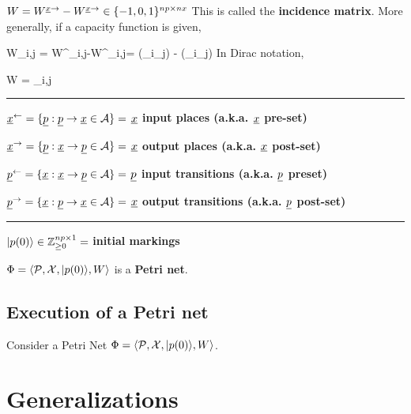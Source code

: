 $W =W^{{\underline{x}} \rightarrow}-W^{{\underline{x}} \rightarrow}\in \{-1, 0, 1\}^{np\times nx}$ This is called the {\bf incidence matrix}.
More generally, if a capacity function is given, 

\beq
W_{i,j} =
 W^{\rvx \rarrow}_{i,j}-W^{\rvx \larrow}_{i,j}=
\kappa(\rvp_i\rarrow \rvx_j)
-
\kappa(\rvp_i\larrow \rvx_j)
\eeq
In Dirac notation, 

\beq
W =  \sum_{i,j}
\eeq

\hrule
${\underline{x}}^\leftarrow = \{{\underline{p}} : {\underline{p}} \rightarrow {\underline{x}}\in{\cal A}\}=$ {\bf ${\underline{x}}$ input places (a.k.a. ${\underline{x}}$ pre-set)}

${\underline{x}}^\rightarrow = \{{\underline{p}} : {\underline{x}} \rightarrow {\underline{p}} \in {\cal A}\}=$ {\bf ${\underline{x}}$ output places (a.k.a. ${\underline{x}}$ post-set)}

${\underline{p}}^\leftarrow = \{{\underline{x}} : {\underline{x}} \rightarrow {\underline{p}} \in {\cal A} \}=$ {\bf${\underline{p}}$ input transitions (a.k.a. ${\underline{p}}$ preset)}

${\underline{p}}^\rightarrow = \{{\underline{x}} : {\underline{p}} \rightarrow{\underline{x}} \in{\cal A}\}=$ {\bf ${\underline{x}}$ output transitions (a.k.a. ${\underline{p}}$ post-set)}

\hrule
$|p(0)\rangle\in {\mathbb{Z}}_{\geq 0}^{np\times 1} =$ {\bf initial markings}

$\Phi = \left\langle{\cal P}, {\cal X},|p(0)\rangle, W\right\rangle$ is a {\bf Petri net}.
\subsection{Execution of a Petri net}
Consider a Petri Net $\Phi = \left\langle{\cal P}, {\cal X},|p(0)\rangle, W\right\rangle$.
\section{Generalizations}
